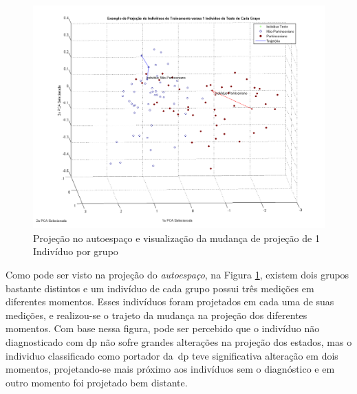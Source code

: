 \begin{figure}
 \centering
 \includegraphics[scale=0.45]{./img/projecao-pca-parkinson-healthy.png}
\caption{Projeção no autoespaço e visualização da mudança de projeção de 1 Indivíduo por grupo}
 \label{fig:projecaopcaparkinson}
\end{figure}

Como pode ser visto na projeção do \textit{autoespaço}, na Figura \ref{fig:projecaopcaparkinson}, existem dois grupos bastante distintos e um indivíduo de cada grupo possui três medições em diferentes momentos. Esses indivíduos foram projetados em cada uma de suas medições, e realizou-se o trajeto da mudança na projeção dos diferentes momentos. Com base nessa figura, pode ser percebido que o indivíduo não diagnosticado com \ac{dp} não sofre grandes alterações na projeção dos estados, mas o individuo classificado como portador da~\ac{dp} teve significativa alteração em dois momentos, projetando-se mais próximo aos indivíduos sem o diagnóstico e em outro momento foi projetado bem distante.

%


